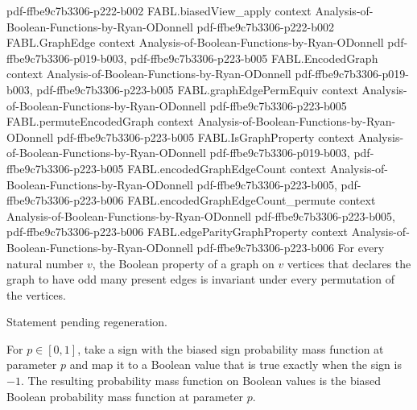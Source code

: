 \begin{theorem}
{    pdf-ffbe9c7b3306-p222-b002}
\proofstep
  {FABL.biasedView_apply}
  {context}
  {Analysis-of-Boolean-Functions-by-Ryan-ODonnell}
  {pdf-ffbe9c7b3306-p222-b002}
\proofstep
  {FABL.GraphEdge}
  {context}
  {Analysis-of-Boolean-Functions-by-Ryan-ODonnell}
  {pdf-ffbe9c7b3306-p019-b003,
    pdf-ffbe9c7b3306-p223-b005}
\proofstep
  {FABL.EncodedGraph}
  {context}
  {Analysis-of-Boolean-Functions-by-Ryan-ODonnell}
  {pdf-ffbe9c7b3306-p019-b003,
    pdf-ffbe9c7b3306-p223-b005}
\proofstep
  {FABL.graphEdgePermEquiv}
  {context}
  {Analysis-of-Boolean-Functions-by-Ryan-ODonnell}
  {pdf-ffbe9c7b3306-p223-b005}
\proofstep
  {FABL.permuteEncodedGraph}
  {context}
  {Analysis-of-Boolean-Functions-by-Ryan-ODonnell}
  {pdf-ffbe9c7b3306-p223-b005}
\proofstep
  {FABL.IsGraphProperty}
  {context}
  {Analysis-of-Boolean-Functions-by-Ryan-ODonnell}
  {pdf-ffbe9c7b3306-p019-b003,
    pdf-ffbe9c7b3306-p223-b005}
\proofstep
  {FABL.encodedGraphEdgeCount}
  {context}
  {Analysis-of-Boolean-Functions-by-Ryan-ODonnell}
  {pdf-ffbe9c7b3306-p223-b005,
    pdf-ffbe9c7b3306-p223-b006}
\proofstep
  {FABL.encodedGraphEdgeCount_permute}
  {context}
  {Analysis-of-Boolean-Functions-by-Ryan-ODonnell}
  {pdf-ffbe9c7b3306-p223-b005,
    pdf-ffbe9c7b3306-p223-b006}
\proofstep
  {FABL.edgeParityGraphProperty}
  {context}
  {Analysis-of-Boolean-Functions-by-Ryan-ODonnell}
  {pdf-ffbe9c7b3306-p223-b006}
For every natural number $v$, the Boolean property of a graph on $v$ vertices that
declares the graph to have odd many present edges is invariant under every permutation
of the vertices.
\end{theorem}

\begin{theorem}
\label{FABL.edgeMajority_isMonotoneGraphProperty}
\leanok
{}
Statement pending regeneration.
\end{theorem}

\begin{definition}
\label{FABL.biasedBoolPMF}
\leanok
{}
For $p\in[0,1]$, take a sign with the biased sign probability mass function at parameter
$p$ and map it to a Boolean value that is true exactly when the sign is $-1$. The
resulting probability mass function on Boolean values is the biased Boolean probability
mass function at parameter $p$.
\end{definition}

